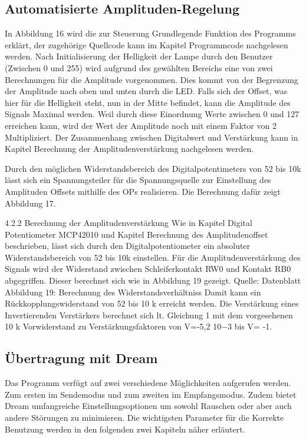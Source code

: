 \subsection{Automatisierte Amplituden-Regelung}
\label{subsec:autoamp}
In Abbildung 16 wird die zur Steuerung Grundlegende Funktion des Programms erklärt, der zugehörige Quellcode kann im Kapitel Programmcode nachgelesen werden. Nach Initialisierung der Helligkeit der Lampe durch den Benutzer (Zwischen 0 und 255) wird aufgrund des gewählten Bereichs eine von zwei Berechnungen für die Amplitude vorgenommen. Dies kommt von der Begrenzung der Amplitude nach oben und
unten durch die LED. Falls sich der Offset, was hier für die Helligkeit steht, nun in der Mitte
befindet, kann die Amplitude des Signals Maximal werden. Weil durch diese Einordnung Werte zwischen 0 und 127 erreichen kann, wird der Wert der Amplitude noch mit einem Faktor von 2 Multipliziert. Der Zusammenhang zwischen Digitalwert und Verstärkung  kann in Kapitel Berechnung der Amplitudenverstärkung nachgelesen werden.

Durch den möglichen Widerstandsbereich des Digitalpotentimeters von 52 
bis
10k
lässt sich ein Spannungsteiler für die Spannungsquelle zur Einstellung des
Amplituden Offsets mithilfe des OPs realisieren. Die Berechnung dafür zeigt Abbildung
17.

4.2.2 Berechnung der Amplitudenverstärkung
Wie in Kapitel Digital Potentiometer MCP42010 und Kapitel Berechnung des Amplitudenoffset
beschrieben, lässt sich durch den Digitalpotentiometer ein absoluter
Widerstandsbereich von 52 
bis 10k
einstellen. Für die Amplitudenverstärkung
des Signals wird der Widerstand zwischen Schleiferkontakt RW0 und Kontakt RB0
abgegriffen. Dieser berechnet sich wie in Abbildung 19 gezeigt.
Quelle: Datenblatt
Abbildung 19: Berechnung des Widerstandsverhältniss
Damit kann ein Rückkopplungswiderstand von 52
bis 10 k
erreicht werden. Die
Verstärkung eines Invertierenden Verstärkers berechnet sich lt. Gleichung 1 mit
dem vorgesehenen 10 k
Vorwiderstand zu Verstärkungsfaktoren von
V=-5,2 10−3 bis V= -1.

\subsection{Übertragung mit Dream}
\label{subsec:dream}

Das Programm verfügt auf zwei verschiedene Möglichkeiten aufgerufen werden. Zum ersten im Sendemodus und zum zweiten im Empfangsmodus. Zudem bietet Dream umfangreiche Einstellungsoptionen um sowohl Rauschen oder aber auch andere Störungen zu minimieren. Die wichtigsten Parameter für die Korrekte Benutzung werden in den folgenden zwei Kapiteln näher erläutert.



